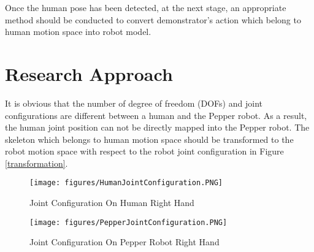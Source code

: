 Once the human pose has been detected, at the next stage, an appropriate method should be conducted to convert demonstrator's action which belong to human motion space into robot model. 
\section{Research Approach}

It is obvious that the number of degree of freedom (DOFs) and joint configurations are different between a human and the Pepper robot. As a result, the human joint position can not be directly mapped into the Pepper robot. The skeleton which belongs to human motion space should be transformed to the robot motion space with respect to the robot joint configuration in Figure \ref{transformation}.

\begin{figure}[t!]
	\begin{center}
		\texttt{[image: figures/HumanJointConfiguration.PNG]}
	\end{center}
	\caption{Joint Configuration On Human Right Hand}
	\label{HumanJointConfiguration}
\end{figure}

\begin{figure}[t!]
	\begin{center}
		\texttt{[image: figures/PepperJointConfiguration.PNG]}
	\end{center}
	\caption{Joint Configuration On Pepper Robot Right Hand}
	\label{PepperJointConfiguration}
\end{figure}

